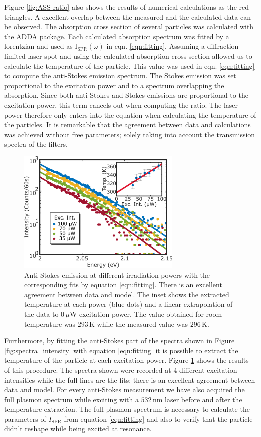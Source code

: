 \documentclass[journal=nalefd,manuscript=letter]{achemso}
\newcommand{\K}{\ensuremath{\,\textrm{K}}}
\newcommand{\nm}{\ensuremath{\,\textrm{nm}}}
\newcommand{\uW}{\ensuremath{\,\mu\textrm{W}}}
\begin{document}
Figure \ref{fig:ASS-ratio} also shows the results of numerical calculations as the red
triangles. A excellent overlap between the measured and the calculated data can
be observed. The absorption cross section of several particles was calculated
with the ADDA package\cite{Yurkin2011}. Each calculated absorption spectrum was
fitted by a lorentzian and used as $\textrm{I}_{\textrm{SPR}}(\omega)$ in eqn.
\ref{eqn:fitting}. Assuming a diffraction limited laser spot and using the
calculated absorption cross section allowed us to calculate the temperature of
the particle. This value was used in eqn. \ref{eqn:fitting} to compute the
anti-Stokes emission spectrum. The Stokes emission was set proportional to the
excitation power and to a spectrum overlapping the absorption. Since both
anti-Stokes and Stokes emissions are proportional to the excitation power, this
term cancels out when computing the ratio. The laser power therefore only enters
into the equation when calculating the temperature of the particles. It is
remarkable that the agreement between data and calculations was achieved
without free parameters; solely taking into account the transmission spectra of
the filters.

\begin{figure}[tp] \centering
\includegraphics[width=78.4mm]{Figures/03_Fit_Of_AS/03_Log_Fit_AS.png}
\caption{Anti-Stokes emission at different irradiation powers with the
corresponding fits by equation \ref{eqn:fitting}. There is an excellent
agreement between data and model. The inset shows the extracted
temperature at each power (blue dots) and a linear extrapolation of the data to $0\uW$ excitation power.
The value obtained for room temperature was $293\K$ while the measured value was
$296\K$.}
	\label{fig:AS_in_Log}
\end{figure}

Furthermore, by fitting the anti-Stokes part of the spectra shown in Figure
\ref{fig:spectra_intensity} with equation \ref{eqn:fitting} it is possible to extract
the temperature of the particle at each excitation power. Figure
\ref{fig:AS_in_Log} shows the results of this procedure. The spectra shown were
recorded at $4$ different excitation intensities while the full lines are the
fits; there is an excellent agreement between data and model. For every
anti-Stokes measurement we have also acquired the full plasmon spectrum while
exciting with a $532\nm$ laser before and after the temperature extraction.
The full plasmon spectrum is necessary to calculate the parameters of
$I_\textrm{SPR}$ from equation \ref{eqn:fitting} and also to verify that the
particle didn't reshape while being excited at resonance. 
\end{document}
